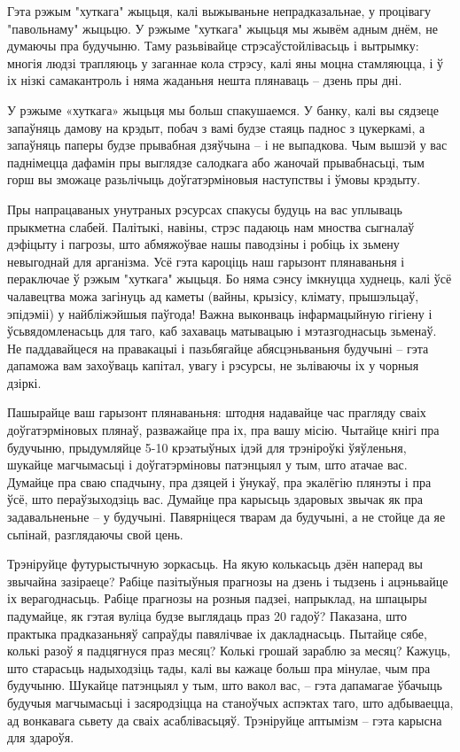 Гэта рэжым "хуткага" жыцьця, калі выжываньне непрадказальнае, у процівагу "павольнаму" жыцьцю. У рэжыме "хуткага" жыцьця мы жывём адным днём, не думаючы пра будучыню. Таму разьвівайце стрэсаўстойлівасьць і вытрымку: многія людзі трапляюць у заганнае кола стрэсу, калі яны моцна стамляюцца, і ў іх нізкі самакантроль і няма жаданьня нешта плянаваць – дзень пры дні.

У рэжыме «хуткага» жыцьця мы больш спакушаемся. У банку, калі вы сядзеце запаўняць дамову на крэдыт, побач з вамі будзе стаяць паднос з цукеркамі, а запаўняць паперы будзе прывабная дзяўчына – і не выпадкова. Чым вышэй у вас паднімецца дафамін пры выглядзе салодкага або жаночай прывабнасьці, тым горш вы зможаце разьлічыць доўгатэрміновыя наступствы і ўмовы крэдыту.

Пры напрацаваных унутраных рэсурсах спакусы будуць на вас уплываць прыкметна слабей. Палітыкі, навіны, стрэс падаюць нам мноства сыгналаў дэфіцыту і пагрозы, што абмяжоўвае нашы паводзіны і робіць іх зьмену невыгоднай для арганізма. Усё гэта кароціць наш гарызонт плянаваньня і пераключае ў рэжым "хуткага" жыцьця. Бо няма сэнсу імкнуцца худнець, калі ўсё чалавецтва можа загінуць ад каметы (вайны, крызісу, клімату, прышэльцаў, эпідэміі) у найбліжэйшыя паўгода! Важна выконваць інфармацыйную гігіену і ўсьвядомленасьць для таго, каб захаваць матывацыю і мэтазгоднасьць зьменаў. Не паддавайцеся на правакацыі і пазьбягайце абясцэньваньня будучыні – гэта дапаможа вам захоўваць капітал, увагу і рэсурсы, не зьліваючы іх у чорныя дзіркі.

Пашырайце ваш гарызонт плянаваньня: штодня надавайце час прагляду сваіх доўгатэрміновых плянаў, разважайце пра іх, пра вашу місію. Чытайце кнігі пра будучыню, прыдумляйце 5-10 крэатыўных ідэй для трэніроўкі ўяўленьня, шукайце магчымасьці і доўгатэрміновы патэнцыял у тым, што атачае вас. Думайце пра сваю спадчыну, пра дзяцей і ўнукаў, пра экалёгію плянэты і пра ўсё, што пераўзыходзіць вас. Думайце пра карысьць здаровых звычак як пра задавальненьне – у будучыні. Павярніцеся тварам да будучыні, а не стойце да яе сьпінай, разглядаючы свой цень.

Трэніруйце футурыстычную зоркасьць. На якую колькасьць дзён наперад вы звычайна зазіраеце? Рабіце пазітыўныя прагнозы на дзень і тыдзень і ацэньвайце іх верагоднасьць. Рабіце прагнозы на розныя падзеі, напрыклад, на шпацыры падумайце, як гэтая вуліца будзе выглядаць праз 20 гадоў? Паказана, што практыка прадказаньняў сапраўды павялічвае іх дакладнасьць. Пытайце сябе, колькі разоў я падцягнуся праз месяц? Колькі грошай зараблю за месяц? Кажуць, што старасьць надыходзіць тады, калі вы кажаце больш пра мінулае, чым пра будучыню. Шукайце патэнцыял у тым, што вакол вас, – гэта дапамагае ўбачыць будучыя магчымасьці і засяродзіцца на станоўчых аспэктах таго, што адбываецца, ад вонкавага сьвету да сваіх асаблівасьцяў. Трэніруйце аптымізм – гэта карысна для здароўя.

